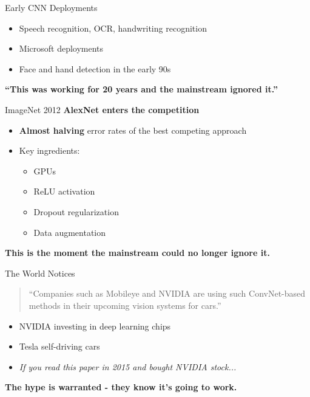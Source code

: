 \begin{frame}{Early CNN Deployments}
    \begin{itemize}
        \item Speech recognition, OCR, handwriting recognition
        \item Microsoft deployments
        \item Face and hand detection in the early 90s
    \end{itemize}
    
    \vspace{1em}
    \textbf{``This was working for 20 years and the mainstream ignored it.''}
\end{frame}

\begin{frame}{ImageNet 2012}
    \textbf{AlexNet enters the competition}
    
    \vspace{1em}
    \begin{itemize}
        \item \textbf{Almost halving} error rates of the best competing approach
        \item Key ingredients:
        \begin{itemize}
            \item GPUs
            \item ReLU activation
            \item Dropout regularization
            \item Data augmentation
        \end{itemize}
    \end{itemize}
    
    \vspace{1em}
    \textbf{This is the moment the mainstream could no longer ignore it.}
\end{frame}

\begin{frame}{The World Notices}
    \begin{quote}
        ``Companies such as Mobileye and NVIDIA are using such ConvNet-based methods in their upcoming vision systems for cars.''
    \end{quote}
    
    \vspace{1em}
    \begin{itemize}
        \item NVIDIA investing in deep learning chips
        \item Tesla self-driving cars
        \item \textit{If you read this paper in 2015 and bought NVIDIA stock...}
    \end{itemize}
    
    \vspace{1em}
    \textbf{The hype is warranted - they know it's going to work.}
\end{frame}

